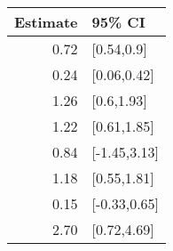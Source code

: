 \begin{tabular}{rl}
  \hline
Estimate & 95\% CI \\ 
  \hline
0.72 & [0.54,0.9] \\ 
  0.24 & [0.06,0.42] \\ 
  1.26 & [0.6,1.93] \\ 
  1.22 & [0.61,1.85] \\ 
  0.84 & [-1.45,3.13] \\ 
  1.18 & [0.55,1.81] \\ 
  0.15 & [-0.33,0.65] \\ 
  2.70 & [0.72,4.69] \\ 
   \hline
\end{tabular}

